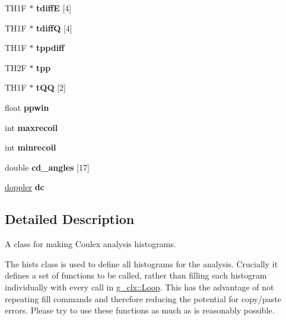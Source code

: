 \begin{DoxyCompactItemize}
\item 
\mbox{\label{classhists_a034f8db2fb5bbc3799a21c972875d8dc}} 
T\+H1F $\ast$ {\bfseries tdiffE} \mbox{[}4\mbox{]}
\item 
\mbox{\label{classhists_ac86bf3c25b09b83c0d8efa3832671a23}} 
T\+H1F $\ast$ {\bfseries tdiffQ} \mbox{[}4\mbox{]}
\item 
\mbox{\label{classhists_a882cee022acf8051bd5c18b0177dcd5e}} 
T\+H1F $\ast$ {\bfseries tppdiff}
\item 
\mbox{\label{classhists_aa38f4682a254eb6873d3ad87677f5275}} 
T\+H2F $\ast$ {\bfseries tpp}
\item 
\mbox{\label{classhists_ad4f783d5dd26a2fb7c4c314035710688}} 
T\+H1F $\ast$ {\bfseries t\+QQ} \mbox{[}2\mbox{]}
\item 
\mbox{\label{classhists_af469b4438ba88b1af6df026c9dff4928}} 
float {\bfseries ppwin}
\item 
\mbox{\label{classhists_aee1035f05bda36071913fc087f8ef80f}} 
int {\bfseries maxrecoil}
\item 
\mbox{\label{classhists_ab46b91f1c6cbd9bff55649ee709a95e8}} 
int {\bfseries minrecoil}
\item 
\mbox{\label{classhists_af9ae33bfde7848988faf5941f429d404}} 
double {\bfseries cd\+\_\+angles} \mbox{[}17\mbox{]}
\item 
\mbox{\label{classhists_a5bb6611932e44875a143ccd7812ce712}} 
\hyperlink{classdoppler}{doppler} {\bfseries dc}
\end{DoxyCompactItemize}


\subsection{Detailed Description}
A class for making Coulex analysis histograms. 

The hists class is used to define all histograms for the analysis. Crucially it defines a set of functions to be called, rather than filling each histogram individually with every call in \hyperlink{classg__clx_a9d5de859df4bfbb746726661ff1d24a9}{g\+\_\+clx\+::\+Loop}. This has the advantage of not repeating fill commands and therefore reducing the potential for copy/paste errors. Please try to use these functions as much as is reasonably possible. 

